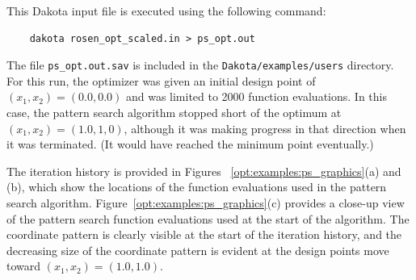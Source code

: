 This Dakota input file is executed using the following command:
\begin{small}
\begin{verbatim}
    dakota rosen_opt_scaled.in > ps_opt.out
\end{verbatim}
\end{small}

The file \texttt{ps\_opt.out.sav} is included in the
\texttt{Dakota/examples/users} directory. For this run, the
optimizer was given an initial design point of $(x_1,x_2)
  = (0.0,0.0)$ and was limited to 2000 function evaluations. In this
case, the pattern search algorithm stopped short of the optimum at
$(x_1,x_2) = (1.0,1,0)$, although it was making progress
in that direction when it was terminated. (It would have
reached the minimum point eventually.)

The iteration history is provided in Figures~
\ref{opt:examples:ps_graphics}(a) and (b), which show
the locations of the function evaluations used in the pattern search
algorithm.
Figure~\ref{opt:examples:ps_graphics}(c)
provides a close-up view of the pattern search function evaluations
used at the start of the algorithm. The coordinate pattern is clearly
visible at the start of the iteration history, and the decreasing size
of the coordinate pattern is evident at the design points move toward
$(x_1,x_2) = (1.0,1.0)$.

